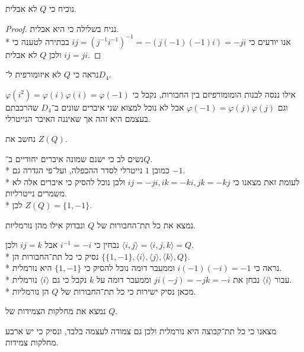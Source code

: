 \Subquestion{}
נוכיח כי $Q$ לא אבלית.
\begin{proof}
	נניח בשלילה כי היא אבלית. \\*
	אנו יודעים כי $ij = {(j^{-1} i^{-1})}^{-1} = -(j (-1)(-1) i) = -ji$ בבתירה לטענה כי $ij = ji$ ולכן $Q$ לא אבלית.
\end{proof}

\Subquestion{}
נראה כי $Q$ לא איזומורפית ל־$D_4$.

אילו ננסה לבנות הומומורפיזם בין החבורות, נקבל כי $\varphi(i^2) = \varphi(i) \varphi(i) = \varphi(-1)$
וגם $\varphi(-1) = \varphi(j) \varphi(j)$ אבל לא נוכל למצוא שני איברים שונים ב־$D_4$ שהרכבתם בעצמם היא זהה אך שאיננה האיבר הנייטרלי.

\Subquestion{}
נחשב את $Z(Q)$.

נשים לב כי ישנם שמונה איברים יחודיים ב־$Q$. \\*
כמובן $1$ נייטרלי לסדר ההכפלה, ועל־פי הגדרה גם $-1$. \\*
לעומת זאת מצאנו כי $ij = -ji, ik = -ki, jk = -kj$ ולכן נוכל להסיק כי איברים אלה לא משמרים נייטרליות. \\*
לכן $Z(Q) = \{1, -1\}$.

\Subquestion{}
נמצא את כל תת־החבורות של $Q$ ונבדוק אילו מהן נורמליות.

נבחין כי $i^{-1} = -i$ אבל $ij = k$ ולכן $\langle i, j \rangle = \langle i, j, k \rangle = Q$. \\*
נסיק כי כל תת־החבורות הן $\{ \{1, -1\}, \langle i \rangle, \langle j \rangle, \langle k \rangle , Q\}$. \\*
נראה כי $i (-1) (-i) = -1$ וממעבר דומה נוכל להסיק כי $\{1, -1\}$ היא נורמלית. \\*
עבור $\langle i \rangle$ נבחן את $j i (-j) = -j k = -i$ וממעבר דומה על $k$ נקבל כי גם $\langle i \rangle$ נורמלית. \\*
מכאן נסיק ישירות כי כל תת־החבורות של $Q$ הן נורמליות.

\Subquestion{}
נמצא את מחלקות הצמידות של $Q$.

מצאנו כי כל תת־קבוצה היא נורמלית ולכן גם צמודה לעצמה בלבד, ונסיק כי יש ארבע מחלקות צמידות.



